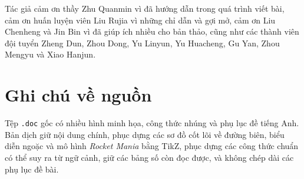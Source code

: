 \documentclass[11pt]{article}
\begin{document}
Tác giả cảm ơn thầy Zhu Quanmin vì đã hướng dẫn trong quá trình viết bài, cảm
ơn huấn luyện viên Liu Rujia vì những chỉ dẫn và gợi mở, cảm ơn Liu Chenheng
và Jin Bin vì đã giúp ích nhiều cho bản thảo, cũng như các thành viên đội
tuyển Zheng Dun, Zhou Dong, Yu Linyun, Yu Huacheng, Gu Yan, Zhou Mengyu và
Xiao Hanjun.

\section*{Ghi chú về nguồn}

Tệp \texttt{.doc} gốc có nhiều hình minh họa, công thức nhúng và phụ lục đề
tiếng Anh. Bản dịch giữ nội dung chính, phục dựng các sơ đồ cốt lõi về đường
biên, biểu diễn ngoặc và mô hình \textit{Rocket Mania} bằng TikZ, phục dựng
các công thức chuẩn có thể suy ra từ ngữ cảnh, giữ các bảng số còn đọc được,
và không chép dài các phụ lục đề bài.
\end{document}
